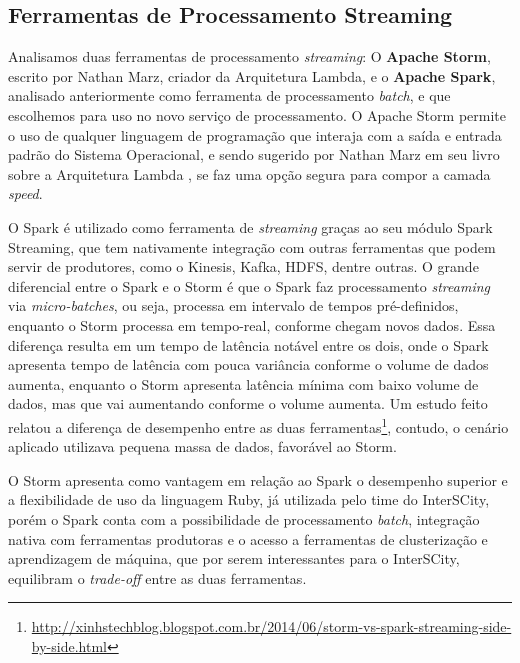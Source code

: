 
\subsection{Ferramentas de Processamento Streaming}

Analisamos duas ferramentas de processamento \textit{streaming}: O
\textbf{Apache Storm}, escrito por Nathan Marz, criador da Arquitetura
Lambda, e o \textbf{Apache Spark}, analisado anteriormente como ferramenta de
processamento \textit{batch}, e que escolhemos para uso no novo serviço de
processamento. O Apache Storm permite o uso de qualquer
linguagem de programação que interaja com a saída e entrada padrão do Sistema
Operacional, e sendo sugerido por Nathan Marz em seu livro sobre a Arquitetura
Lambda \cite{marz2015}, se faz uma opção segura para compor a camada
\textit{speed}.

O Spark é utilizado como ferramenta de \textit{streaming} graças ao seu módulo
Spark Streaming, que tem nativamente integração com outras ferramentas que
podem servir de produtores, como o Kinesis, Kafka, HDFS, dentre outras. O
grande diferencial entre o Spark e o Storm é que o Spark faz processamento
\textit{streaming} via \textit{micro-batches}, ou seja, processa em intervalo
de tempos pré-definidos, enquanto o Storm processa em tempo-real, conforme
chegam novos dados. Essa diferença resulta em um tempo de latência notável
entre os dois, onde o Spark apresenta tempo de latência com pouca variância
conforme o volume de dados aumenta, enquanto o Storm apresenta latência mínima
com baixo volume de dados, mas que vai aumentando conforme o volume aumenta.
Um estudo feito relatou a diferença de desempenho entre as duas
ferramentas\footnote{\url{http://xinhstechblog.blogspot.com.br/2014/06/storm-vs-spark-streaming-side-by-side.html}},
contudo, o cenário aplicado utilizava pequena massa de dados, favorável ao
Storm.

O Storm apresenta como vantagem em relação ao Spark o desempenho
superior e a flexibilidade de uso da linguagem Ruby, já utilizada pelo time
do InterSCity, porém o Spark conta com a possibilidade de processamento
\textit{batch}, integração nativa com ferramentas produtoras e o acesso a
ferramentas de clusterização e aprendizagem de máquina, que por serem
interessantes para o InterSCity, equilibram o \textit{trade-off} entre as
duas ferramentas.

